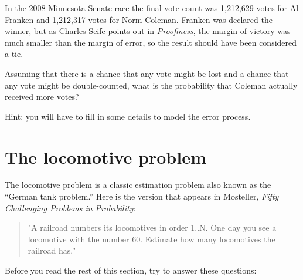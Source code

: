 \documentclass[12pt]{book}
\begin{document}
\begin{ex}


In the 2008 Minnesota Senate race the final vote count was 1,212,629
votes for Al Franken and 1,212,317 votes for Norm Coleman.  Franken
was declared the winner, but as Charles Seife points out in {\it
  Proofiness}, the margin of victory was much smaller than the margin
of error, so the result should have been considered a tie.


Assuming that there is a chance that any vote might be lost and a chance
that any vote might be double-counted, what is the probability that
Coleman actually received more votes?

Hint: you will have to fill in some details to model the error process.

\end{ex}


\section{The locomotive problem}


The locomotive problem is a classic estimation problem also
known as the ``German tank problem.''  Here is the version
that appears in Mosteller, {\it Fifty Challenging Problems in
  Probability}:

\begin{quote}
"A railroad numbers its locomotives in order 1..N.  One day you see a
locomotive with the number 60.  Estimate how many locomotives the
railroad has."
\end{quote}

Before you read the rest of this section, try to answer these
questions:

\newcommand{\nhat}{\hat{N}}
\end{document}

